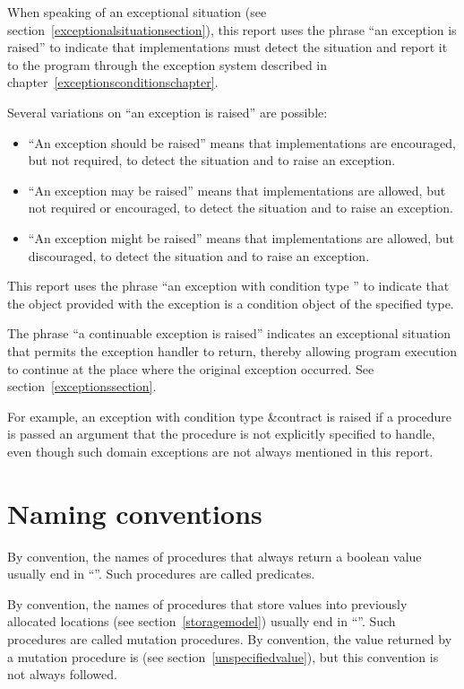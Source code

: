 When speaking of an exceptional situation (see section~\ref{exceptionalsituationsection}), this
report uses the phrase ``an exception is raised'' to indicate
that implementations must detect the situation and report it to the
program through the exception system described in
chapter~\ref{exceptionsconditionschapter}.

Several variations on ``an exception is raised'' are possible:

\begin{itemize}
\item ``An exception should be raised'' means that implementations
  are encouraged, but not required, to detect the situation
  and to raise an exception.

\item ``An exception may be raised'' means that implementations
are allowed, but not required or encouraged, to detect
the situation and to raise an exception.

\item ``An exception might be raised'' means that implementations
are allowed, but discouraged, to detect the situation
and to raise an exception.
\end{itemize}

This report uses the phrase ``an exception with condition type ''
to indicate that the object provided with the
exception is a condition object of the specified type.

The phrase ``a continuable exception is raised'' indicates
an exceptional situation that permits the exception handler to return,
thereby allowing program execution to continue at the place where the
original exception occurred.  See section~\ref{exceptionssection}.

\vest For example, an exception with condition type {\cf\&contract}
is raised if a procedure is passed an argument that the procedure
is not explicitly specified to handle, even though such domain
exceptions are not always mentioned in this report.

\section{Naming conventions}

By convention, the names of procedures that always return a boolean
value usually end
in ``''.  Such procedures are called predicates.

By convention, the names of procedures that store values into previously
allocated locations (see section~\ref{storagemodel}) usually end in
``\ide{!}''.
Such procedures are called mutation procedures.
By convention, the value returned by a mutation procedure is
\unspecifiedreturn{} (see section~\ref{unspecifiedvalue}),
but this convention is not always followed.

